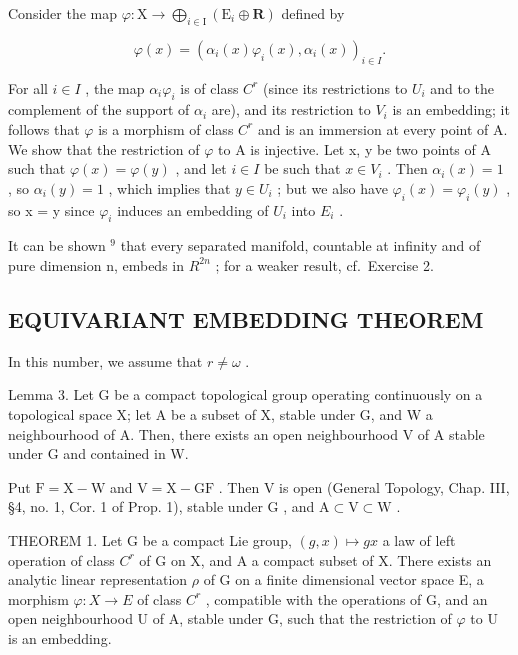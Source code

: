 Consider the map \(\varphi : \mathrm{X} \to \bigoplus_{i \in \mathrm{I}} (\mathrm{E}_i \oplus \mathbf{R})\) defined by

\[
\varphi (x) = (\alpha_ {i} (x) \varphi_ {i} (x), \alpha_ {i} (x)) _ {i \in I}.
\]

For all \(i \in I\) , the map \(\alpha_{i}\varphi_{i}\) is of class \(C^{r}\) (since its restrictions to \(U_{i}\) and to the complement of the support of \(\alpha_{i}\) are), and its restriction to \(V_{i}\) is an embedding; it follows that \(\varphi\) is a morphism of class \(C^{r}\) and is an immersion at every point of A. We show that the restriction of \(\varphi\) to A is injective. Let x, y be two points of A such that \(\varphi(x) = \varphi(y)\) , and let \(i \in I\) be such that \(x \in V_{i}\) . Then \(\alpha_{i}(x) = 1\) , so \(\alpha_{i}(y) = 1\) , which implies that \(y \in U_{i}\) ; but we also have \(\varphi_{i}(x) = \varphi_{i}(y)\) , so x = y since \(\varphi_{i}\) induces an embedding of \(U_{i}\) into \(E_{i}\) .

It can be shown \(^{9}\) that every separated manifold, countable at infinity and of pure dimension n, embeds in \(R^{2n}\) ; for a weaker result, cf.~Exercise 2.

\subsection{EQUIVARIANT EMBEDDING THEOREM}

In this number, we assume that \(r \neq \omega\) .

Lemma 3. Let G be a compact topological group operating continuously on a topological space X; let A be a subset of X, stable under G, and W a neighbourhood of A. Then, there exists an open neighbourhood V of A stable under G and contained in W.

Put \(\mathrm{F} = \mathrm{X} - \mathrm{W}\) and \(\mathrm{V} = \mathrm{X} - \mathrm{GF}\) . Then \(\mathrm{V}\) is open (General Topology, Chap. III, §4, no. 1, Cor. 1 of Prop. 1), stable under \(\mathrm{G}\) , and \(\mathrm{A} \subset \mathrm{V} \subset \mathrm{W}\) .

THEOREM 1. Let G be a compact Lie group, \((g,x)\mapsto gx\) a law of left operation of class \(C^{r}\) of G on X, and A a compact subset of X. There exists an analytic linear representation \(\rho\) of G on a finite dimensional vector space E, a morphism \(\varphi:X\to E\) of class \(C^{r}\) , compatible with the operations of G, and an open neighbourhood U of A, stable under G, such that the restriction of \(\varphi\) to U is an embedding.

